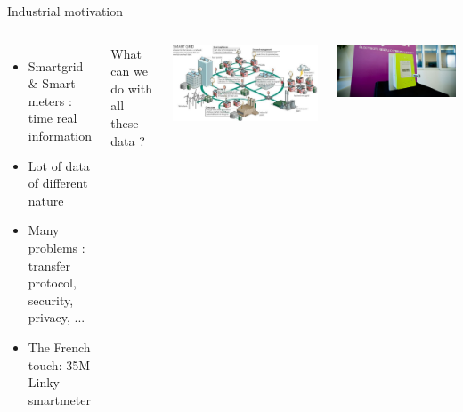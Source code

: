\documentclass[xcolor=dvipsnames, smaller]{beamer}
\begin{document}
\begin{frame}{Industrial motivation}

\begin{columns}
\begin{itemize}
 \item Smartgrid \& Smart meters : time real information
  \item Lot of data of different nature
 \item Many problems : transfer protocol, security, privacy, ...
 \item The French touch: 35M Linky smartmeter
\end{itemize}

\vskip 1cm

What can we do with all these data ?

\includegraphics[width = \textwidth]{./pics/smartgrid.jpg} 

\includegraphics[width = \textwidth]{./pics/linky.jpg} 
\end{columns}
\end{frame}

\end{document}
